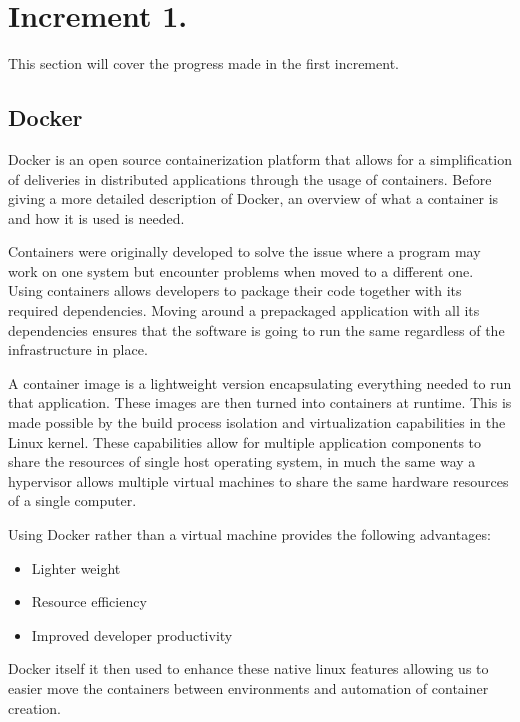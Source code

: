 \section{Increment 1.}
This section will cover the progress made in the first increment. 


\subsection{Docker}
Docker is an open source containerization platform that allows for a simplification of deliveries in distributed applications through the usage of containers. 
Before giving a more detailed description of Docker, an overview of what a container is and how it is used is needed. 


Containers were originally developed to solve the issue where a program may work on one system but encounter problems when moved to a different one. 
Using containers allows developers to package their code together with its required dependencies. 
Moving around a prepackaged application with all its dependencies ensures that the software is going to run the same regardless of the infrastructure in place. 


A container image is a lightweight version encapsulating everything needed to run that application. These images are then turned into containers at runtime. 
This is made possible by the build process isolation and virtualization capabilities in the Linux kernel. 
These capabilities allow for multiple application components to share the resources of single host operating system, 
in much the same way a hypervisor allows multiple virtual machines to share the same hardware resources of a single computer. 


Using Docker rather than a virtual machine provides the following advantages:

\begin{itemize}
    \item Lighter weight
    \item Resource efficiency
    \item Improved developer productivity
\end{itemize}

Docker itself it then used to enhance these native linux features allowing us to easier move the containers between environments and automation of container creation.

